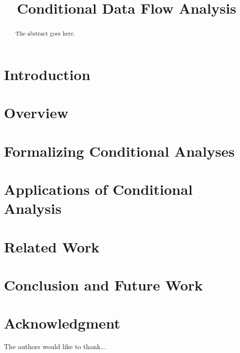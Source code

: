 \documentclass[conference]{IEEEtran}
\begin{document}
\title{Conditional Data Flow Analysis}


\author{
\and
{}
}

\maketitle

\begin{abstract}
The abstract goes here.
\end{abstract}

\section{Introduction}
\label{section:introduction}


\section{Overview}
\label{section:overview}


\section{Formalizing Conditional Analyses}
\label{section:formalizing}


\section{Applications of Conditional Analysis}
\label{section:applications}


\section{Related Work}
\label{section:Related}


\section{Conclusion and Future Work}
\label{section:conclusion}


\section*{Acknowledgment}
The authors would like to thank...



\end{document}
